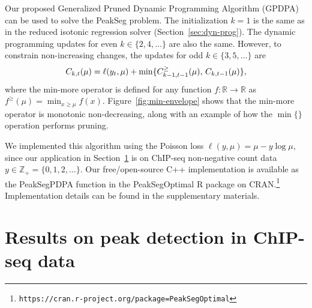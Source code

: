 \documentclass[aoas]{imsart}
\newcommand{\url}[1]{\texttt{#1}}
\newcommand{\ZZ}{\mathbb Z}
\newcommand{\RR}{\mathbb R}
\begin{document}
Our proposed Generalized Pruned Dynamic Programming Algorithm (GPDPA)
can be used to solve the PeakSeg problem. The initialization $k=1$ is
the same as in the reduced isotonic regression solver
(Section~\ref{sec:dyn-prog}). The dynamic programming updates for even
$k\in\{2, 4, \dots\}$ are also the same. However, to constrain non-increasing
changes, the updates for odd $k\in\{3, 5, \dots\}$ are
\begin{equation}
  \FCC_{k,t}(\mu) = \ell(y_t, \mu) + \min\{
  \FCC_{k-1,t-1}^\geq(\mu),\, \FCC_{k,t-1}(\mu)
  \},
\end{equation}
where the min-more operator is defined for any function $f:\RR\rightarrow\RR$ as
$f^\geq(\mu) = \min_{x\geq \mu} f(x)$. Figure~\ref{fig:min-envelope}
shows that the min-more operator is monotonic non-decreasing, along
with an example of how the $\min\{\}$ operation performs pruning.

We implemented this algorithm using the Poisson loss
$\ell(y, \mu) = \mu - y\log \mu$, since our application in
Section~\ref{sec:results-chip-seq} is on ChIP-seq non-negative count data
$y\in\ZZ_+ = \{0, 1, 2, \dots\}$.
Our free/open-source C++ implementation is
available as the PeakSegPDPA function in the PeakSegOptimal R package
on
CRAN.\footnote{\url{https://cran.r-project.org/package=PeakSegOptimal}}
Implementation details can be found in the supplementary materials.

\section{Results on peak detection in ChIP-seq data}
\label{sec:results-chip-seq}
\label{sec:results}

\end{document}
